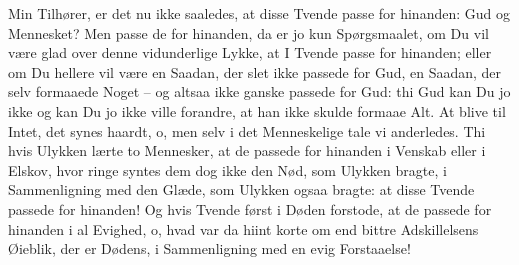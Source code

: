 \documentclass[12pt,a4paper]{article}
\begin{document}
Min Tilhører, er det nu ikke saaledes, at disse Tvende passe for hinanden: Gud og Mennesket? Men passe de for hinanden, da er jo kun Spørgsmaalet, om Du vil være glad over denne vidunderlige Lykke, at I Tvende passe for hinanden; eller om Du hellere vil være en Saadan, der slet ikke passede for Gud, en Saadan, der selv formaaede Noget – og altsaa ikke ganske passede for Gud: thi Gud kan Du jo ikke og kan Du jo ikke ville forandre, at han ikke skulde formaae Alt. At blive til Intet, det synes haardt, o, men selv i det Menneskelige tale vi anderledes. Thi hvis Ulykken lærte to Mennesker, at de passede for hinanden i Venskab eller i Elskov, hvor ringe syntes dem dog ikke den Nød, som Ulykken bragte, i Sammenligning med den Glæde, som Ulykken ogsaa bragte: at disse Tvende passede for hinanden! Og hvis Tvende først i Døden forstode, at de passede for hinanden i al Evighed, o, hvad var da hiint korte om end bittre Adskillelsens Øieblik, der er Dødens, i Sammenligning med en evig Forstaaelse!
\end{document}
